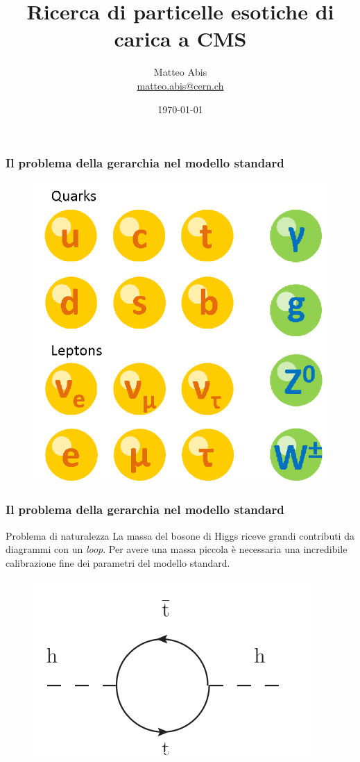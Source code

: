 \documentclass[italian]{beamer}
\title[Ricerca di partner del top]{Ricerca di particelle esotiche di carica
    \nicefrac{5}{3} a CMS}
\author{Matteo Abis\\
\url{matteo.abis@cern.ch}}
\institute{Università di Padova}
\date{\today}
\begin{document}
\begingroup
\begin{frame}
  \titlepage
\end{frame}
\endgroup
 
\begin{frame}
    \frametitle{Il problema della gerarchia nel modello standard}
    \begin{figure}[h]
        \centering
        \includegraphics[width=.5\textwidth]{standard_model_particles}
    \end{figure}
\end{frame}
\begin{frame}
    \frametitle{Il problema della gerarchia nel modello standard}
    \begin{block}
        {Problema di naturalezza}
        La massa del bosone di Higgs riceve grandi contributi da diagrammi
        con un \emph{loop}. Per avere una massa piccola \`e
        necessaria una incredibile calibrazione fine dei parametri del
        modello standard. 
    \end{block}
    \begin{figure}[h]
        \centering
        \includegraphics[height=.4\textheight]{higgs_correction}
    \end{figure}
\end{frame}
\end{document}
